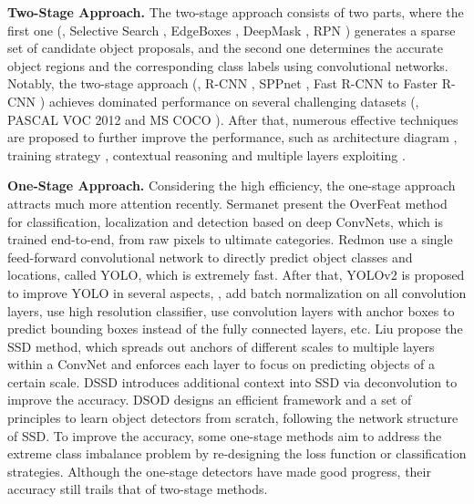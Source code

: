 \documentclass[10pt,twocolumn,letterpaper]{article}
\begin{document}
{\noindent \textbf{Two-Stage Approach.}} The two-stage approach consists of two parts, where the first one (\eg, Selective Search \cite{DBLP:journals/ijcv/UijlingsSGS13}, EdgeBoxes \cite{DBLP:conf/eccv/ZitnickD14}, DeepMask \cite{DBLP:conf/nips/PinheiroCD15,DBLP:conf/eccv/PinheiroLCD16}, RPN \cite{DBLP:journals/pami/RenHG017}) generates a sparse set of candidate object proposals, and the second one determines the accurate object regions and the corresponding class labels using convolutional networks. Notably, the two-stage approach (\eg, R-CNN \cite{DBLP:conf/cvpr/GirshickDDM14}, SPPnet \cite{DBLP:conf/eccv/HeZR014}, Fast R-CNN \cite{DBLP:conf/iccv/Girshick15} to Faster R-CNN \cite{DBLP:journals/pami/RenHG017}) achieves dominated performance on several challenging datasets (\eg, PASCAL VOC 2012 \cite{pascal-voc-2012} and MS COCO \cite{DBLP:conf/eccv/LinMBHPRDZ14}). After that, numerous effective techniques are proposed to further improve the performance, such as architecture diagram \cite{DBLP:conf/nips/DaiLHS16,DBLP:journals/corr/LeeEK17,DBLP:conf/iccv/abs-1708-02863}, training strategy \cite{DBLP:conf/cvpr/ShrivastavaGG16,DBLP:conf/cvpr/WangSG17}, contextual reasoning \cite{DBLP:conf/cvpr/BellZBG16,DBLP:conf/iccv/GidarisK15,DBLP:conf/eccv/ShrivastavaG16,DBLP:conf/eccv/ZengOYYW16} and multiple layers exploiting \cite{DBLP:conf/eccv/CaiFFV16,DBLP:conf/cvpr/KongYCS16,DBLP:conf/cvpr/LinDGHHB17,DBLP:journals/corr/ShrivastavaSMG16}.

{\noindent \textbf{One-Stage Approach.}} Considering the high efficiency, the one-stage approach attracts much more attention recently. Sermanet \etal \cite{DBLP:journals/corr/SermanetEZMFL13} present the OverFeat method for classification, localization and detection based on deep ConvNets, which is trained end-to-end, from raw pixels to ultimate categories. Redmon \etal \cite{DBLP:conf/cvpr/RedmonDGF16} use a single feed-forward convolutional network to directly predict object classes and locations, called YOLO, which is extremely fast. After that, YOLOv2 \cite{DBLP:journals/corr/RedmonF16} is proposed to improve YOLO in several aspects, \ie, add batch normalization on all convolution layers, use high resolution classifier, use convolution layers with anchor boxes to predict bounding boxes instead of the fully connected layers, etc. Liu \etal \cite{DBLP:conf/eccv/LiuAESRFB16} propose the SSD method, which spreads out anchors of different scales to multiple layers within a ConvNet and enforces each layer to focus on predicting objects of a certain scale. DSSD \cite{DBLP:journals/corr/FuLRTB17} introduces additional context into SSD via deconvolution to improve the accuracy. DSOD \cite{DBLP:conf/iccv/abs-1708-01241} designs an efficient framework and a set of principles to learn object detectors from scratch, following the network structure of SSD. To improve the accuracy, some one-stage methods \cite{DBLP:conf/cvpr/KongSYLLC17,DBLP:conf/iccv/LinPRK17,DBLP:conf/iccv/abs-1708-05237} aim to address the extreme class imbalance problem by re-designing the loss function or classification strategies. Although the one-stage detectors have made good progress, their accuracy still trails that of two-stage methods.
\end{document}
